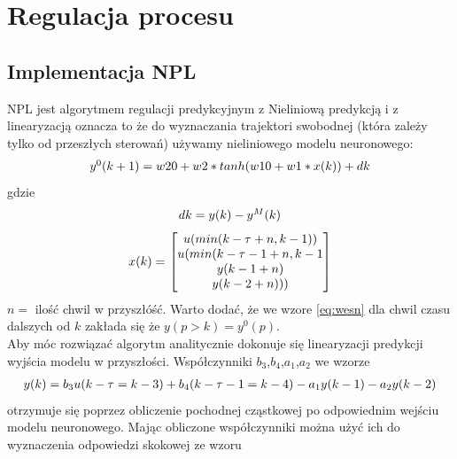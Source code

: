 \chapter{Regulacja procesu}
	\label{ch:reg}
	
	\section{Implementacja NPL}
		\label{sec:NPL}
		NPL jest algorytmem regulacji predykcyjnym z Nieliniową predykcją i z linearyzacją oznacza to że do wyznaczania trajektori swobodnej (która zależy tylko od przeszłych sterowań) używamy nieliniowego modelu neuronowego:
		\begin{equation}
		\begin{tabular}{l}
		$y^0(k+1)=w20+w2*tanh(w10+w1*x(k))+dk$
		\end{tabular}
		\label{eq:NPL_y0}
		\end{equation}
		gdzie
		\begin{equation}
		\begin{tabular}{l}
		$dk = y(k)-y^M(k)$
		\end{tabular}
		\label{eq:dk}
		\end{equation}
		\begin{equation}
		\begin{tabular}{l}
		$x(k)=$ $\begin{bmatrix}u(min(k-\tau+n,k-1))\\u(min(k-\tau-1+n,k-1\\y(k-1+n)\\y(k-2+n)))\end{bmatrix}$
		\end{tabular}
		\label{eq:wesn}
		\end{equation}
		$n=$ ilość chwil w przyszłóść.
		Warto dodać, że we wzore \ref{eq:wesn} dla chwil czasu dalszych od $k$ zakłada się że $y(p>k)=y^0(p)$.\\
		Aby móc rozwiązać algorytm analitycznie dokonuje się linearyzacji predykcji wyjścia modelu w przyszłości. Współczynniki $b_3$,$b_4$,$a_1$,$a_2$ we wzorze
		\begin{equation}
		\begin{tabular}{l}
		$y(k)=b_3u(k-\tau=k-3)+b_4(k-\tau-1=k-4)-a_1y(k-1)-a_2y(k-2)$
		\end{tabular}
		\label{eq:NPL_wyjscielinear}
		\end{equation}
		otrzymuje się poprzez obliczenie pochodnej cząstkowej po odpowiednim wejściu modelu neuronowego. Mając obliczone współczynniki można użyć ich do wyznaczenia odpowiedzi skokowej ze wzoru
